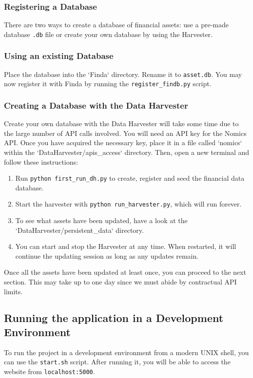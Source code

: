 \documentclass[main.tex]{subfiles}
\begin{document}
\subsubsection{Registering a Database}

There are two ways to create a database of financial assets: use a pre-made database \texttt{.db} file or create your own database by using the Harvester.

\subsubsection*{Using an existing Database}
\label{existing-db-instructions}

Place the database into the `Finda` directory. Rename it to \texttt{asset.db}. You may now register it with Finda by running the \texttt{register\_findb.py} script.

\subsubsection*{Creating a Database with the Data Harvester}
\label{make-your-own-db-instructions}

Create your own database with the Data Harvester will take some time due to the large number of API calls involved. You will need an API key for the Nomics API. Once you have acquired the necessary key, place it in a file called `nomics` within the `DataHarvester/apis\_access` directory. Then, open a new terminal and follow these instructions:
\begin{enumerate}
  \item Run \texttt{python\ first\_run\_dh.py} to create, register and seed the financial data database.
\item
  Start the harvester with \texttt{python\ run\_harvester.py},
  which will run forever.
\item
  To see what assets have been updated, have a look at the
  `DataHarvester/persistent\_data` directory.
\item
  You can start and stop the Harvester at any time. When
  restarted, it will continue the updating session as long as any updates remain.
\end{enumerate}
Once all the assets have been updated at least once, you can proceed to the next section. This may take up to one day since we must abide by contractual API limits.

\subsection{Running the application in a Development Environment}
  To run the project in a development environment from a modern UNIX shell, you can use the \texttt{start.sh} script. After running it, you will be able to access the website from \texttt{localhost:5000}.
\end{document}
